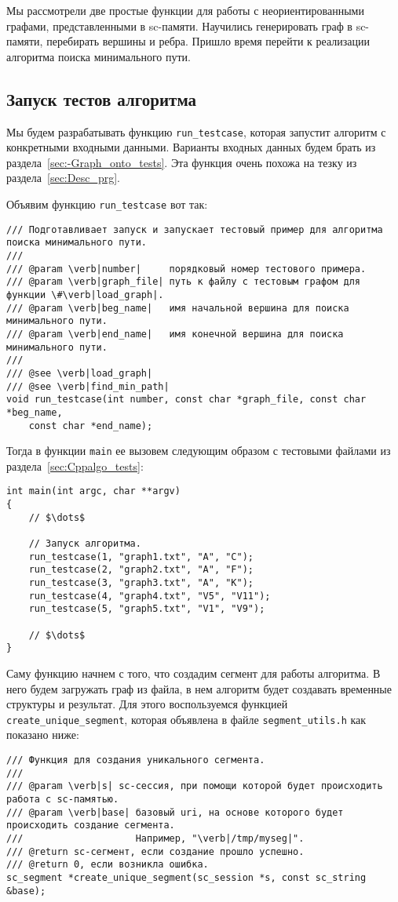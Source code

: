 Мы рассмотрели две простые функции для работы с неориентированными
графами, представленными в sc-памяти. Научились генерировать граф в
sc-памяти, перебирать вершины и ребра. Пришло время перейти к
реализации алгоритма поиска минимального пути.

\subsection{Запуск тестов алгоритма}
\label{sec:libscprg_run_testcase}

Мы будем разрабатывать функцию \lstinline|run_testcase|, которая
запустит алгоритм с конкретными входными данными. Варианты входных
данных будем брать из раздела~\ref{sec:-Graph_onto_tests}. Эта функция
очень похожа на тезку из раздела~\ref{sec:Desc_prg}.

Объявим функцию \lstinline|run_testcase| вот так:
\begin{lstlisting}[texcl]
/// Подготавливает запуск и запускает тестовый пример для алгоритма поиска минимального пути.
///
/// @param \verb|number|     порядковый номер тестового примера.
/// @param \verb|graph_file| путь к файлу с тестовым графом для функции \#\verb|load_graph|.
/// @param \verb|beg_name|   имя начальной вершина для поиска минимального пути.
/// @param \verb|end_name|   имя конечной вершина для поиска минимального пути.
///
/// @see \verb|load_graph|
/// @see \verb|find_min_path|
void run_testcase(int number, const char *graph_file, const char *beg_name,
    const char *end_name);
\end{lstlisting}

Тогда в функции \lstinline|main| ее вызовем следующим образом с
тестовыми файлами из раздела~\ref{sec:Cppalgo_tests}:
\begin{lstlisting}[texcl]
int main(int argc, char **argv)
{
    // $\dots$

    // Запуск алгоритма.
    run_testcase(1, "graph1.txt", "A", "C");
    run_testcase(2, "graph2.txt", "A", "F");
    run_testcase(3, "graph3.txt", "A", "K");
    run_testcase(4, "graph4.txt", "V5", "V11");
    run_testcase(5, "graph5.txt", "V1", "V9");

    // $\dots$
}
\end{lstlisting}

Саму функцию начнем с того, что создадим сегмент для работы
алгоритма. В него будем загружать граф из файла, в нем алгоритм будет
создавать временные структуры и результат. Для этого воспользуемся
функцией \lstinline|create_unique_segment|, которая объявлена в файле
\verb|segment_utils.h| как показано ниже:
\begin{lstlisting}[texcl]
/// Функция для создания уникального сегмента.
///
/// @param \verb|s| sc-сессия, при помощи которой будет происходить работа с sc-памятью.
/// @param \verb|base| базовый uri, на основе которого будет происходить создание сегмента.
///                    Например, "\verb|/tmp/myseg|".
/// @return sc-сегмент, если создание прошло успешно.
/// @return 0, если возникла ошибка.
sc_segment *create_unique_segment(sc_session *s, const sc_string &base);
\end{lstlisting}

